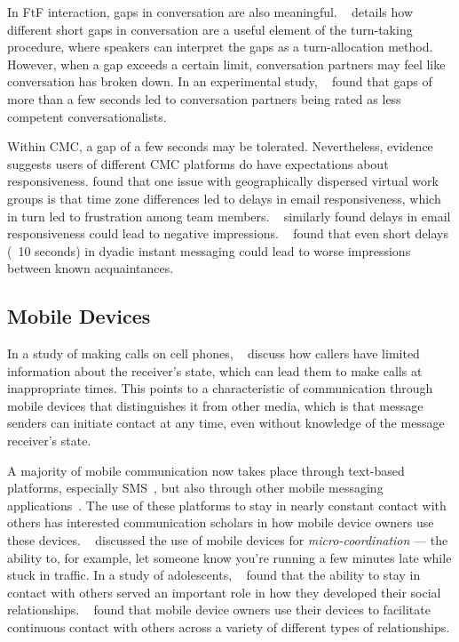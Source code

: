 \documentclass[12pt]{nuthesis}	%
\begin{document}
In FtF interaction, gaps in conversation are also meaningful. ~\citet{mclaughlin1984conversation} details how different short gaps in conversation are a useful element of the turn-taking procedure, where speakers can interpret the gaps as a turn-allocation method. However, when a gap exceeds a certain limit, conversation partners may feel like conversation has broken down. In an experimental study, ~\citet{mclaughlin1982awkward} found that gaps of more than a few seconds led to conversation partners being rated as less competent conversationalists.

Within CMC, a gap of a few seconds may be tolerated. Nevertheless, evidence suggests users of different CMC platforms do have expectations about responsiveness. \citet{cramton2002attribution} found that one issue with geographically dispersed virtual work groups is that time zone differences led to delays in email responsiveness, which in turn led to frustration among team members. ~\citet{kalman2011online} similarly found delays in email responsiveness could lead to negative impressions. ~\citet{heston2017worth} found that even short delays (~10 seconds) in dyadic instant messaging could lead to worse impressions between known acquaintances.

\subsection{Mobile Devices}

In a study of making calls on cell phones, ~\citet{avrahami2007improving} discuss how callers have limited information about the receiver's state, which can lead them to make calls at inappropriate times. This points to a characteristic of communication through mobile devices that distinguishes it from other media, which is that message senders can initiate contact at any time, even without knowledge of the message receiver's state.

A majority of mobile communication now takes place through text-based platforms, especially SMS~\citep{anderson2015technology,battestini2010large,smith2015us}, but also through other mobile messaging applications~\citep{church2013s,duggan2015mobile}. The use of these platforms to stay in nearly constant contact with others has interested communication scholars in how mobile device owners use these devices. ~\citet{ling200210} discussed the use of mobile devices for \textit{micro-coordination} --- the ability to, for example, let someone know you're running a few minutes late while stuck in traffic. In a study of adolescents, ~\citet{kasesniemi200211} found that the ability to stay in contact with others served an important role in how they developed their social relationships. ~\citet{pettegrew2015smart} found that mobile device owners use their devices to facilitate continuous contact with others across a variety of different types of relationships.
\end{document}
